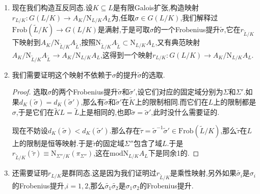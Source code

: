 \begin{enumerate}
\begin{proof}
    	回到原证明,按照引理2,为证明$\mathrm{N}(x)\in\mathrm{N}_{\widetilde{L}/K}A_{\widetilde{L}}$归结为证明$x^{\varphi-1}$落在$I_{G(\widetilde{L}/\widetilde{K})}U_{\widetilde{L}}$.按照$\varphi_{n_i}\circ(\varphi-1)=\varphi^{n_i}-1$,得到$\pi_i^{\varphi^{n_i}-1}=\pi_i^{\tau_i-1}$(因为$\pi_i$被$\sigma_i$固定).于是有$u^{\varphi-1}=\pi_3^{\tau_3-1}\pi_4^{1-\tau_4}\pi_2^{1-\tau_2}$.按照$\tau_3=\tau_2\tau_4$,得到$(\tau_3-1)+(1-\tau_4)+(1-\tau_2)=(1-\tau_2)(1-\tau_4)$.再记$\pi_3=u_3\pi_4$和$\pi_2=u_2^{-1}\pi_4$和$\pi_4^{\tau_2}=u_4\pi_4$,其中$u_i\in U_{\widetilde{L}}$.于是有$u^{\varphi-1}=u_2^{\tau_2-1}u_3^{\tau_3-1}u_4^{\tau_4-1}$落在$I_{G(\widetilde{L}/\widetilde{K})U_{\widetilde{L}}}$中.
    \end{proof}
    \item 现在我们构造互反同态.设$K\subseteq L$是有限Galois扩张,构造映射$r_{L/K}:G(L/K)\to A_K/\mathrm{N}_{L/K}A_L$为,任取$\sigma\in G(L/K)$,我们解释过$\mathrm{Frob}(\widetilde{L}/K)\to G(L/K)$是满射,于是可取$\sigma$的一个Frobenius提升$\widetilde{\sigma}$,它在$r_{\widetilde{L}/K}$下映射到$A_K/\mathrm{N}_{\widetilde{L}/K}A_{\widetilde{L}}$,按照$\mathrm{N}_{\widetilde{L}/K}A_{\widetilde{L}}\subset\mathrm{N}_{L/K}A_L$,又有典范映射$A_K/\mathrm{N}_{\widetilde{L}/K}A_{\widetilde{L}}\to A_K/\mathrm{N}_{L/K}A_L$,这得到一个映射$r_{L/K}:G(L/K)\to A_K/\mathrm{N}_{L/K}A_L$.
    \item 我们需要证明这个映射不依赖于$\sigma$的提升$\widetilde{\sigma}$的选取.
    \begin{proof}
    	
    	选取$\sigma$的两个Frobenius提升$\widetilde{\sigma}$和$\widetilde{\sigma}'$,设它们对应的固定域分别为$\Sigma$和$\Sigma'$.如果$d_K(\widetilde{\sigma})=d_K(\widetilde{\sigma}')$,那么有$\widetilde{\sigma}$和$\widetilde{\sigma}'$在$\widetilde{K}$上的限制相同.而它们在$L$上的限制都是$\sigma$,于是它们在$\widetilde{K}L=\widetilde{L}$上是相同的,也即$\widetilde{\sigma}=\widetilde{\sigma}'$,此时没什么需要证的.
    	
    	现在不妨设$d_K(\widetilde{\sigma})<d_K(\widetilde{\sigma}')$.那么存在$\widetilde{\tau}=\widetilde{\sigma}^{-1}\widetilde{\sigma}'\in\mathrm{Frob}(\widetilde{L}/K)$,那么$\widetilde{\tau}$在$L$上的限制是恒等映射.于是$\widetilde{\tau}$的固定域$\Sigma''$包含了域$L$.于是$r_{\widetilde{L}/K}(\widetilde{\tau})\equiv\mathrm{N}_{\Sigma''/K}(\pi_{\Sigma''})$,这在$\mathrm{mod}\mathrm{N}_{L/K}A_L$下是同余1的.
    \end{proof}
    \item 还需要证明$r_{L/K}$是群同态.这是因为我们证明过$r_{\widetilde{L}/K}$是乘性映射,另外如果$\widetilde{\sigma_i}$是$\sigma_i$的Frobenius提升,$i=1,2$,那么$\widetilde{\sigma_1}\widetilde{\sigma_2}$是$\sigma_1\sigma_2$的Frobenius提升.
\end{enumerate}

